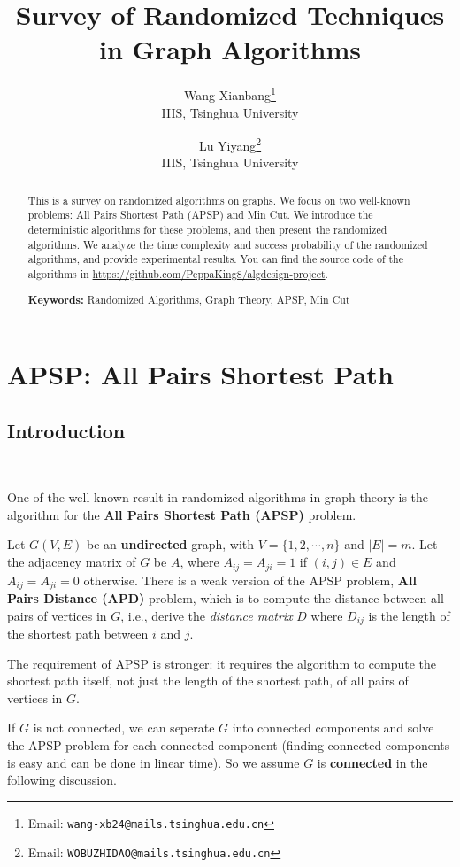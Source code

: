\documentclass[12pt]{article}
\title{Survey of Randomized Techniques in Graph Algorithms}
\author{
    Wang Xianbang\thanks{Email: \texttt{wang-xb24@mails.tsinghua.edu.cn}} \\
    IIIS, Tsinghua University
    \and
    Lu Yiyang\thanks{Email: \texttt{WOBUZHIDAO@mails.tsinghua.edu.cn}} \\
    IIIS, Tsinghua University
}
\begin{document}
\maketitle

\begin{abstract}
    This is a survey on randomized algorithms on graphs. We focus on two well-known problems: All Pairs Shortest Path (APSP) and Min Cut. We introduce the deterministic algorithms for these problems, and then present the randomized algorithms. We analyze the time complexity and success probability of the randomized algorithms, and provide experimental results. You can find the source code of the algorithms in \url{https://github.com/PeppaKing8/algdesign-project}.

    \textbf{Keywords:} Randomized Algorithms, Graph Theory, APSP, Min Cut
\end{abstract}

\section{APSP: All Pairs Shortest Path}
\subsection{Introduction}\

One of the well-known result in randomized algorithms in graph theory is the algorithm for the \textbf{All Pairs Shortest Path (APSP)} problem.

Let $G(V,E)$ be an \textbf{undirected} graph, with $V=\{1,2,\cdots,n\}$ and $|E|=m$. Let the adjacency matrix of $G$ be $A$, where $A_{ij}=A_{ji}=1$ if $(i,j)\in E$ and $A_{ij}=A_{ji}=0$ otherwise. There is a weak version of the APSP problem, \textbf{All Pairs Distance (APD)} problem, which is to compute the distance between all pairs of vertices in $G$, i.e., derive the \emph{distance matrix} $D$ where $D_{ij}$ is the length of the shortest path between $i$ and $j$.

The requirement of APSP is stronger: it requires the algorithm to compute the shortest path itself, not just the length of the shortest path, of all pairs of vertices in $G$. 

If $G$ is not connected, we can seperate $G$ into connected components and solve the APSP problem for each connected component (finding connected components is easy and can be done in linear time). So we assume $G$ is \textbf{connected} in the following discussion.
\end{document}
